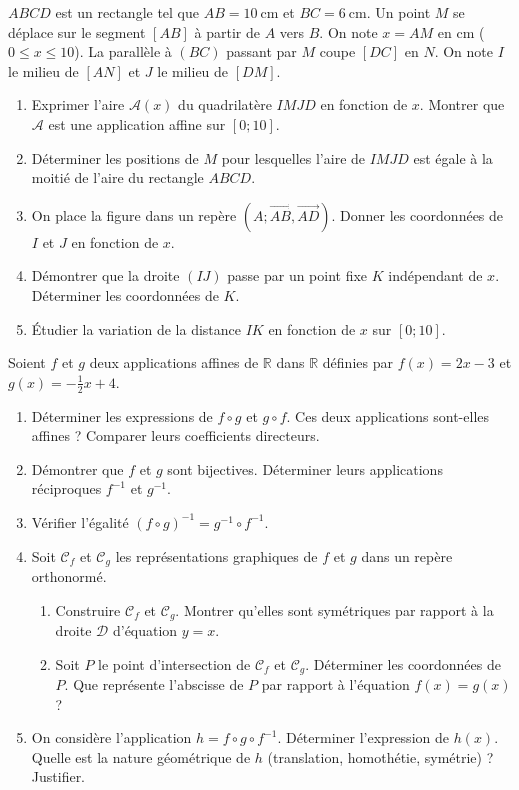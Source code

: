 \documentclass[11pt]{article}
\begin{document}
\begin{exercice}
$ABCD$ est un rectangle tel que $AB = 10~\text{cm}$ et $BC = 6~\text{cm}$. Un point $M$ se déplace sur le segment $[AB]$ à partir de $A$ vers $B$. On note $x = AM$ en cm ($0 \le x \le 10$). La parallèle à $(BC)$ passant par $M$ coupe $[DC]$ en $N$. On note $I$ le milieu de $[AN]$ et $J$ le milieu de $[DM]$.
\begin{enumerate}
    \item Exprimer l'aire $\mathcal{A}(x)$ du quadrilatère $IMJD$ en fonction de $x$. Montrer que $\mathcal{A}$ est une application affine sur $[0;10]$.
    \item Déterminer les positions de $M$ pour lesquelles l'aire de $IMJD$ est égale à la moitié de l'aire du rectangle $ABCD$.
    \item On place la figure dans un repère $(A;\overrightarrow{AB},\overrightarrow{AD})$. Donner les coordonnées de $I$ et $J$ en fonction de $x$.
    \item Démontrer que la droite $(IJ)$ passe par un point fixe $K$ indépendant de $x$. Déterminer les coordonnées de $K$.
    \item Étudier la variation de la distance $IK$ en fonction de $x$ sur $[0;10]$.
\end{enumerate}
\end{exercice}

\begin{exercice}
Soient $f$ et $g$ deux applications affines de $\mathbb{R}$ dans $\mathbb{R}$ définies par $f(x)=2x-3$ et $g(x)=-\frac{1}{2}x+4$.
\begin{enumerate}
    \item Déterminer les expressions de $f \circ g$ et $g \circ f$. Ces deux applications sont-elles affines ? Comparer leurs coefficients directeurs.
    \item Démontrer que $f$ et $g$ sont bijectives. Déterminer leurs applications réciproques $f^{-1}$ et $g^{-1}$.
    \item Vérifier l'égalité $(f \circ g)^{-1} = g^{-1} \circ f^{-1}$.
    \item Soit $\mathcal{C}_f$ et $\mathcal{C}_g$ les représentations graphiques de $f$ et $g$ dans un repère orthonormé.
    \begin{enumerate}
        \item Construire $\mathcal{C}_f$ et $\mathcal{C}_g$. Montrer qu'elles sont symétriques par rapport à la droite $\mathcal{D}$ d'équation $y=x$.
        \item Soit $P$ le point d'intersection de $\mathcal{C}_f$ et $\mathcal{C}_g$. Déterminer les coordonnées de $P$. Que représente l'abscisse de $P$ par rapport à l'équation $f(x)=g(x)$ ?
    \end{enumerate}
    \item On considère l'application $h = f \circ g \circ f^{-1}$. Déterminer l'expression de $h(x)$. Quelle est la nature géométrique de $h$ (translation, homothétie, symétrie) ? Justifier.
\end{enumerate}
\end{exercice}
\end{document}
